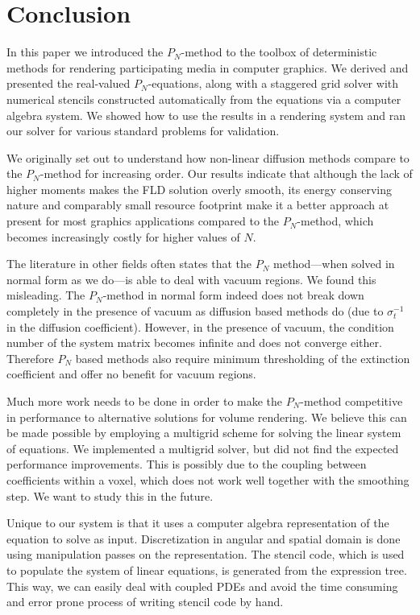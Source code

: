 \documentclass{egpubl}
\newcommand{\nocontentsline}[3]{}
\newcommand{\tocless}[2]{\bgroup\let\addcontentsline=\nocontentsline#1{#2}\egroup}
\begin{document}
\newpage
\tocless\section{Conclusion \label{sec:conclusion}}

In this paper we introduced the $P_N$-method to the toolbox of deterministic methods for rendering participating media in computer graphics. We derived and presented the real-valued $P_N$-equations, along with a staggered grid solver with numerical stencils constructed automatically from the equations via a computer algebra system. We showed how to use the results in a rendering system and ran our solver for various standard problems for validation.

We originally set out to understand how non-linear diffusion methods compare to the $P_N$-method for increasing order. Our results indicate that although the lack of higher moments makes the FLD solution overly smooth, its energy conserving nature and comparably small resource footprint make it a better approach at present for most graphics applications compared to the $P_N$-method, which becomes increasingly costly for higher values of $N$.

The literature in other fields often states that the $P_N$ method---when solved in normal form as we do---is able to deal with vacuum regions. We found this misleading. The $P_N$-method in normal form indeed does not break down completely in the presence of vacuum as diffusion based methods do (due to $\sigma_t^{-1}$ in the diffusion coefficient). However, in the presence of vacuum, the condition number of the system matrix becomes infinite and does not converge either. Therefore $P_N$ based methods also require minimum thresholding of the extinction coefficient and offer no benefit for vacuum regions.

Much more work needs to be done in order to make the $P_N$-method competitive in performance to alternative solutions for volume rendering. We believe this can be made possible by employing a multigrid scheme for solving the linear system of equations. We implemented a multigrid solver, but did not find the expected performance improvements. This is possibly due to the coupling between coefficients within a voxel, which does not work well together with the smoothing step. We want to study this in the future.

Unique to our system is that it uses a computer algebra representation of the equation to solve as input. Discretization in angular and spatial domain is done using manipulation passes on the representation. The stencil code, which is used to populate the system of linear equations, is generated from the expression tree. This way, we can easily deal with coupled PDEs and avoid the time consuming and error prone process of writing stencil code by hand.
\end{document}
